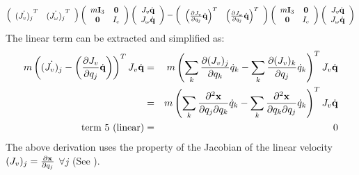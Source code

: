 \begin{eqnarray}
\label{eq:term5}
\left (
\begin{array}{cc}
\dot{(J_v)_j}^T & \dot{(J_\omega)_j}^T
\end{array} 
\right )
\left(
\begin{array}{cc}
m\mathbf{I}_3 & \mathbf{0} \\
\mathbf{0} & I_c
\end{array}
\right)
\left (
\begin{array}{cc}
J_v \dot{\mathbf{q}} \\
J_\omega \dot{\mathbf{q}}
\end{array} 
\right )
-
\left (
\begin{array}{cc}
\left(\frac{\partial J_v}{\partial q_j}\dot{\mathbf{q}}\right)^T & \left(\frac{\partial J_\omega}{\partial q_j}\dot{\mathbf{q}}\right)^T
\end{array} 
\right )
\left(
\begin{array}{cc}
m\mathbf{I}_3 & \mathbf{0} \\
\mathbf{0} & I_c
\end{array}
\right)
\left (
\begin{array}{cc}
J_v \dot{\mathbf{q}} \\
J_\omega \dot{\mathbf{q}}
\end{array} 
\right )
\end{eqnarray}
The linear term can be extracted and simplified as:
\begin{eqnarray}
\label{eq:term5_lin}
\nonumber
m\left( \dot{(J_v)_j}  - \left(\frac{\partial J_v}{\partial q_j}\dot{\mathbf{q}}\right) \right )^T J_v \dot{\mathbf{q}} & = & m\left( \sum_k \frac{\partial (J_v)_j}{\partial q_k}\dot{q}_k -  \sum_k \frac{\partial (J_v)_k}{\partial q_j} \dot{q}_k \right )^T J_v \dot{\mathbf{q}}\\
\nonumber
& = & m\left( \sum_k \frac{\partial^2 \mathbf{x}}{\partial q_j \partial q_k}\dot{q}_k -  \sum_k \frac{\partial^2 \mathbf{x}}{\partial q_k \partial q_j} \dot{q}_k \right )^T J_v \dot{\mathbf{q}} \\
\mbox{term 5 (linear)} & = & 0
\end{eqnarray}
The above derivation uses the property of the Jacobian of the linear velocity  $(J_v)_j = \frac{\partial \mathbf{x}}{\partial q_j}$ $\forall j$ (See ).

